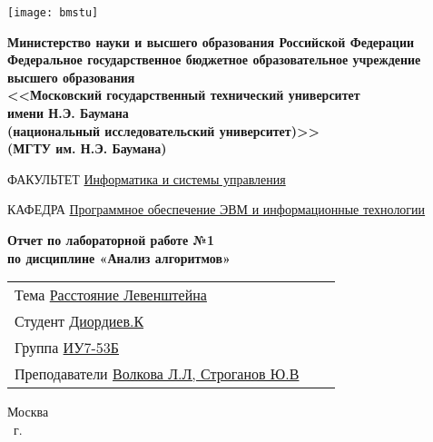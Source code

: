     \thispagestyle{empty}

    \noindent\begin{minipage}{0.05\textwidth}
        \texttt{[image: bmstu]}
    \end{minipage}
    \hfill
    \begin{minipage}{0.85\textwidth}\raggedleft
        \begin{center}
            \fontsize{10pt}{0.3\baselineskip}\selectfont \textbf{Министерство науки и высшего образования Российской Федерации \\ Федеральное государственное бюджетное образовательное учреждение \\ высшего образования \\ <<Московский государственный технический университет \\ имени Н.Э. Баумана \\ (национальный исследовательский университет)>> \\ (МГТУ им. Н.Э. Баумана)}
        \end{center}
    \end{minipage}

    \begin{center}
        \fontsize{12pt}{0.1\baselineskip}\selectfont
        \noindent\makebox[\linewidth]{\rule{\textwidth}{4pt}} \makebox[\linewidth]{\rule{\textwidth}{1pt}}
    \end{center}

    \begin{flushleft}
        \fontsize{12pt}{0.8\baselineskip}\selectfont

        ФАКУЛЬТЕТ \uline{
            \hfill
            Информатика и системы управления
            \hfill}

        КАФЕДРА \uline{\mbox{\hspace{4mm}}
            \hfill
            Программное обеспечение ЭВМ и информационные технологии
            \hfill}
    \end{flushleft}

    \vfill
    
    \begin{center}
        \fontsize{19pt}{\baselineskip}\selectfont

        \textbf{Отчет по лабораторной работе №1} \\
        \textbf{по дисциплине «Анализ алгоритмов»}
    \end{center}

    \vfill
    
    \begin{tabularx}{\textwidth}{Xcc}
        Тема \uline{Расстояние Левенштейна} \\
        Студент \uline{Диордиев.К} \\
        Группа \uline{ИУ7-53Б} \\
        Преподаватели \uline{Волкова Л.Л, Строганов Ю.В} \\
    \end{tabularx}
    
    \vfill
    
    \begin{center}
        \normalsize Москва \\
        \the\year ~г.
    \end{center}
